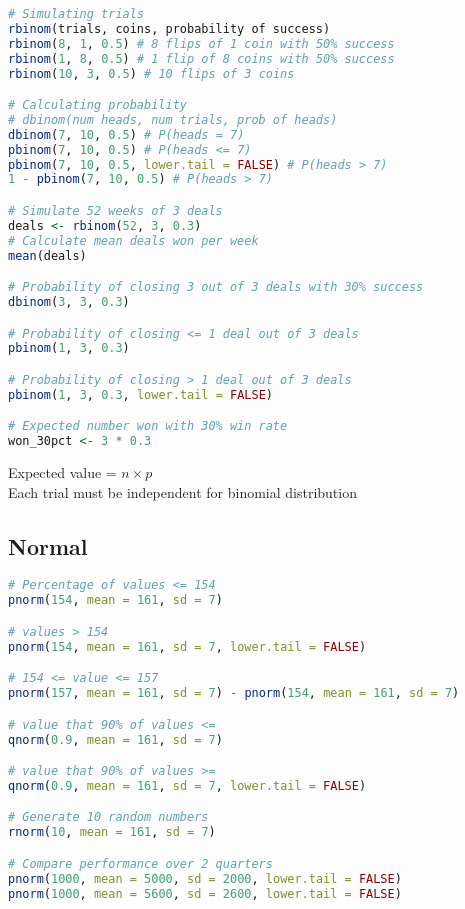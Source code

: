 \documentclass[11pt]{article}
\begin{document}
\begin{lstlisting}[language=R]
# Simulating trials
rbinom(trials, coins, probability of success)
rbinom(8, 1, 0.5) # 8 flips of 1 coin with 50% success
rbinom(1, 8, 0.5) # 1 flip of 8 coins with 50% success
rbinom(10, 3, 0.5) # 10 flips of 3 coins 

# Calculating probability
# dbinom(num heads, num trials, prob of heads)
dbinom(7, 10, 0.5) # P(heads = 7)
pbinom(7, 10, 0.5) # P(heads <= 7)
pbinom(7, 10, 0.5, lower.tail = FALSE) # P(heads > 7)
1 - pbinom(7, 10, 0.5) # P(heads > 7)

# Simulate 52 weeks of 3 deals
deals <- rbinom(52, 3, 0.3)
# Calculate mean deals won per week
mean(deals)

# Probability of closing 3 out of 3 deals with 30% success
dbinom(3, 3, 0.3)

# Probability of closing <= 1 deal out of 3 deals
pbinom(1, 3, 0.3)

# Probability of closing > 1 deal out of 3 deals
pbinom(1, 3, 0.3, lower.tail = FALSE)

# Expected number won with 30% win rate
won_30pct <- 3 * 0.3

\end{lstlisting}

Expected value = $n\times p$\\

Each trial must be independent for binomial distribution

\subsection{Normal}

\begin{lstlisting}[language=R]
# Percentage of values <= 154
pnorm(154, mean = 161, sd = 7)

# values > 154
pnorm(154, mean = 161, sd = 7, lower.tail = FALSE)

# 154 <= value <= 157
pnorm(157, mean = 161, sd = 7) - pnorm(154, mean = 161, sd = 7)

# value that 90% of values <= 
qnorm(0.9, mean = 161, sd = 7)

# value that 90% of values >=
qnorm(0.9, mean = 161, sd = 7, lower.tail = FALSE)

# Generate 10 random numbers
rnorm(10, mean = 161, sd = 7)

# Compare performance over 2 quarters
pnorm(1000, mean = 5000, sd = 2000, lower.tail = FALSE)
pnorm(1000, mean = 5600, sd = 2600, lower.tail = FALSE) 
\end{lstlisting}
\end{document}

